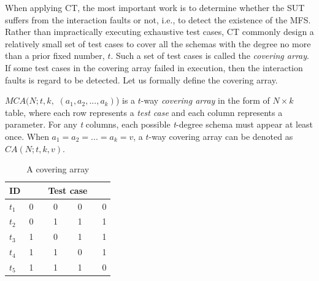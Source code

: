 \documentclass[10pt,journal,cspaper,compsoc]{IEEEtran}
\begin{document}
%
%

When applying CT, the most important work is to determine whether the SUT suffers from the interaction faults or not, i.e., to  detect the existence of the MFS. Rather than impractically executing exhaustive test cases, CT commonly design a relatively small set of test cases to cover all the schemas with the degree no more than a prior fixed number, $t$. Such a set of test cases is called the \emph{covering array}.  If some test cases in the covering array failed in execution, then the interaction faults is regard to be detected. Let us formally define the covering array.

\begin{definition} $MCA(N; t, k,$ $(a_{1}, a_{2}, ..., a_{k})$) is a $t$-way \emph{covering array} in the form of $N \times k$ table, where each row represents a \emph{test case} and each column represents a parameter.  For any \emph{t} columns, each possible \emph{t}-degree schema must appear at least once. When $ a_{1} = a_{2} = ... = a_{k} = v $, a $t$-way covering array can be denoted as $CA(N; t, k, v)$.
\end{definition}

\begin{table}[!ht]
\renewcommand{\arraystretch}{1.3}
\caption{A covering array}
\label{ca_example}
\centering
\begin{tabular}{l|llll}
 \hline
ID &\multicolumn{4}{c}{\bfseries Test case} \\  \hline
$t_{1}$ &\multicolumn{4}{l}{0  \ \ \ \  0 \ \ \ \  0 \ \ \ \ 0} \\
$t_{2}$ &\multicolumn{4}{l}{0  \ \ \ \  1 \ \ \ \  1 \ \ \ \ 1} \\
$t_{3}$ &\multicolumn{4}{l}{1  \ \ \ \  0 \ \ \ \  1 \ \ \ \ 1} \\
$t_{4}$ &\multicolumn{4}{l}{1  \ \ \ \  1 \ \ \ \  0 \ \ \ \ 1} \\
$t_{5}$ &\multicolumn{4}{l}{1  \ \ \ \  1 \ \ \ \  1 \ \ \ \ 0} \\
 \hline
\end{tabular}
\end{table}
\end{document}

